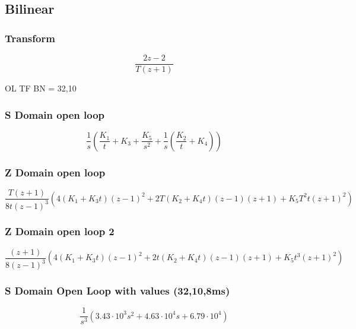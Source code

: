 \cite{arashBook}
\clearpage


\subsection{Bilinear}

\subsubsection{Transform}
\begin{equation}
\frac{2 z - 2}{T \left(z + 1\right)}
\end{equation}

OL TF BN = 32,10

\subsubsection{S Domain open loop}
\begin{equation}
\frac{1}{s} \left(\frac{K_{1}}{t} + K_{3} + \frac{K_{5}}{s^{2}} + \frac{1}{s} \left(\frac{K_{2}}{t} + K_{4}\right)\right)
\end{equation}

\subsubsection{Z Domain open loop}

\begin{equation}
\frac{T\left(z + 1\right) }{8 t \left(z - 1\right)^{3}} \left(4(K_{1}  + K_{3} t)  \left(z - 1\right)^{2}  + 2 T \left(K_{2} + K_{4} t\right) \left(z - 1\right) \left(z + 1\right) + K_{5} T^{2} t \left(z + 1\right)^{2} \right)
\end{equation}

\subsubsection{Z Domain open loop 2}
\begin{equation}
\frac{\left(z + 1\right)}{8 \left(z - 1\right)^{3}} \left(4(K_{1}  + K_{3} t)  \left(z - 1\right)^{2} + 2 t \left(K_{2} + K_{4} t\right) \left(z - 1\right) \left(z + 1\right) + K_{5} t^{3} \left(z + 1\right)^{2}\right)
\end{equation}






\subsubsection{S Domain Open Loop with values (32,10,8ms)}
\begin{equation}
\frac{1}{s^{3}} \left(3.43 \cdot 10^{3} s^{2} + 4.63 \cdot 10^{4} s + 6.79 \cdot 10^{4}\right)
\end{equation}


